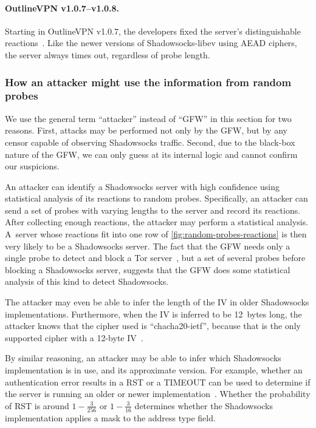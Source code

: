 \documentclass[sigconf,letterpaper]{acmart}
\begin{document}
\paragraph{OutlineVPN v1.0.7--v1.0.8.}

Starting in OutlineVPN v1.0.7,
the developers fixed the server's distinguishable reactions~\cite{outline-timeout, Frolov2020a}.
Like the newer versions of Shadowsocks-libev using AEAD ciphers,
the server always times out,
regardless of probe length.

\subsubsection{How an attacker might use the information from random probes}

We use the general term ``attacker'' instead of ``GFW''
in this section for two reasons.
First, attacks may be performed not only by the GFW,
but by any censor capable of observing Shadowsocks traffic.
Second, due to the black-box nature of the GFW,
we can only guess at its internal logic and cannot confirm our suspicions.

An attacker can identify a Shadowsocks server with high confidence
using statistical analysis of its reactions to random probes.
Specifically, an attacker can send a set of probes with varying lengths to the server and record its reactions.
After collecting enough reactions,
the attacker may perform a statistical analysis.
A~server whose reactions fit into one row of \autoref{fig:random-probes-reactions}
is then very likely to be a Shadowsocks server.
The fact that the GFW needs only a single probe to detect and block a Tor server~\cite{Winter2012a},
but a set of several probes before blocking a Shadowsocks server,
suggests that the GFW does some statistical analysis of this kind to detect Shadowsocks.

The attacker may even be able to infer the length of the IV
in older Shadowsocks implementations.
Furthermore, when the IV is inferred to be 12~bytes long,
the attacker knows that the cipher used is ``chacha20-ietf'',
because that is the only supported cipher with a 12-byte IV~\cite[\S~Stream~Cipher]{spec-shadowsocks}.

By similar reasoning,
an attacker may be able to infer which Shadowsocks implementation is in use,
and its approximate version.
For example, whether an authentication error results in a RST or a TIMEOUT
can be used to determine if the server is running an older or newer implementation~\cite{Frolov2020a}.
Whether the probability of RST is around $1 - \frac{3}{256}$ or $1 - \frac{3}{16}$
determines whether the Shadowsocks implementation applies a mask to the address type field.
\end{document}
